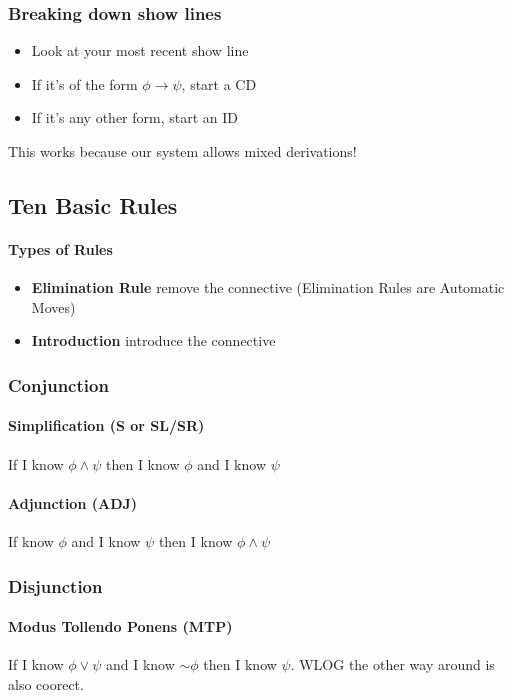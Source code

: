 \documentclass[10pt]{article}
\begin{document}
\subsubsection{Breaking down show lines}
\begin{itemize}
    \item Look at your most recent show line
    \item If it's of the form $\phi\rightarrow \psi$, start a CD 
    \item If it's any other form, start an ID
\end{itemize}
This works because our system allows mixed derivations!

\subsection{Ten Basic Rules}
\paragraph{Types of Rules}
\begin{itemize}
    \item \textbf{Elimination Rule} remove the connective (Elimination
     Rules are Automatic Moves)
    \item \textbf{Introduction} introduce the connective
\end{itemize}

\subsubsection{Conjunction}
\paragraph{Simplification (S or SL/SR)} If I know $\phi\land \psi$ then
 I know $\phi$ and I know $\psi$
\paragraph{Adjunction (ADJ)} If know $\phi$ and I know $\psi$ then I
 know $\phi\land\psi$

\subsubsection{Disjunction}
\paragraph{Modus Tollendo Ponens (MTP)} If I know $\phi \vee \psi$ and 
I know $\sim\phi$ then I know $\psi$. WLOG the other way around is also coorect.
\end{document}
